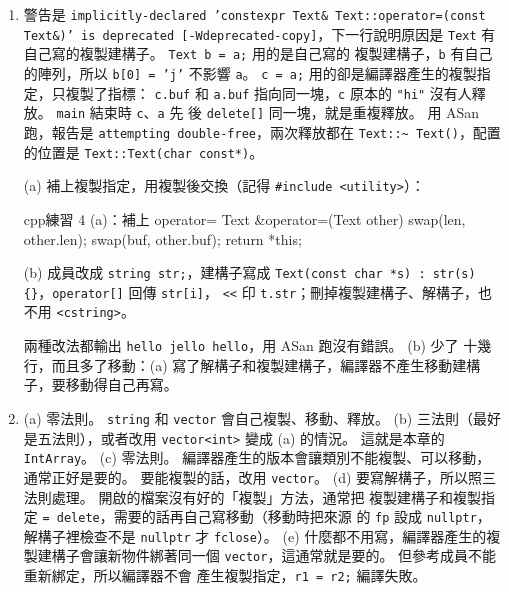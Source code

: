 \begin{enumerate}
\begin{code}{cpp}{練習 3 參考解答（main 同題目）}
bool operator==(const Vector2 &a, const Vector2 &b) {
    return a.getX() == b.getX() && a.getY() == b.getY();
}

double dot(const Vector2 &a, const Vector2 &b) {
    return a.getX() * b.getX() + a.getY() * b.getY();
}

ostream &operator<<(ostream &os, const Vector2 &v) {
    return os << '(' << v.getX() << ", " << v.getY() << ')';
}
\end{code}
\texttt{p *= 3} 需要 \texttt{operator*=}，\texttt{v * k} 和 \texttt{k * v}
都用它來寫。 \texttt{return a += b;} 是把 \texttt{a += b; return a;} 寫成
一行，\texttt{+=} 回傳的就是 \texttt{a}。 有 getter，所以 \texttt{<<} 不
需要 \texttt{friend}。 成員只有兩個 \texttt{double}，照零法則，複製和解構
都不用寫。 要注意 \texttt{==} 直接比 \texttt{double}，經過計算的小數可能
有誤差（例如 \texttt{0.1 + 0.2} 不等於 \texttt{0.3}），實際使用時常改成
「差距小於某個很小的數」。
\item 警告是 \texttt{implicitly-declared 'constexpr Text\& Text::operator=(const
Text\&)' is deprecated [-Wdeprecated-copy]}，下一行說明原因是
\texttt{Text} 有自己寫的複製建構子。 \texttt{Text b = a;} 用的是自己寫的
複製建構子，\texttt{b} 有自己的陣列，所以 \texttt{b[0] = 'j'} 不影響
\texttt{a}。 \texttt{c = a;} 用的卻是編譯器產生的複製指定，只複製了指標：
\texttt{c.buf} 和 \texttt{a.buf} 指向同一塊，\texttt{c} 原本的
\texttt{"hi"} 沒有人釋放。 \texttt{main} 結束時 \texttt{c}、\texttt{a} 先
後 \texttt{delete[]} 同一塊，就是重複釋放。 用 ASan 跑，報告是
\texttt{attempting double-free}，兩次釋放都在 \texttt{Text::\textasciitilde
Text()}，配置的位置是 \texttt{Text::Text(char const*)}。

(a) 補上複製指定，用複製後交換（記得 \texttt{\#include <utility>}）：
\begin{code}{cpp}{練習 4 (a)：補上 operator=}
Text &operator=(Text other) {
    swap(len, other.len);
    swap(buf, other.buf);
    return *this;
}
\end{code}

(b) 成員改成 \texttt{string str;}，建構子寫成
\texttt{Text(const char *s) : str(s) \{\}}，\texttt{operator[]} 回傳 \texttt{str[i]}，
\texttt{<<} 印 \texttt{t.str}；刪掉複製建構子、解構子，也不用
\texttt{<cstring>}。

兩種改法都輸出 \texttt{hello jello hello}，用 ASan 跑沒有錯誤。 (b) 少了
十幾行，而且多了移動：(a) 寫了解構子和複製建構子，編譯器不產生移動建構
子，要移動得自己再寫。
\item
(a) 零法則。 \texttt{string} 和 \texttt{vector} 會自己複製、移動、釋放。
(b) 三法則（最好是五法則），或者改用 \texttt{vector<int>} 變成 (a) 的情況。
這就是本章的 \texttt{IntArray}。
(c) 零法則。 編譯器產生的版本會讓類別不能複製、可以移動，通常正好是要的。
要能複製的話，改用 \texttt{vector}。
(d) 要寫解構子，所以照三法則處理。 開啟的檔案沒有好的「複製」方法，通常把
複製建構子和複製指定 \texttt{= delete}，需要的話再自己寫移動（移動時把來源
的 \texttt{fp} 設成 \texttt{nullptr}，解構子裡檢查不是 \texttt{nullptr} 才
\texttt{fclose}）。
(e) 什麼都不用寫，編譯器產生的複製建構子會讓新物件綁著同一個
\texttt{vector}，這通常就是要的。 但參考成員不能重新綁定，所以編譯器不會
產生複製指定，\texttt{r1 = r2;} 編譯失敗。
\end{enumerate}
